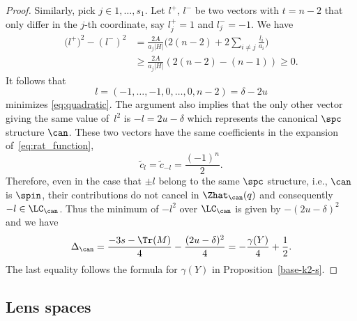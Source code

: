 \documentclass[10pt,a4paper]{amsart}
\begin{document}
\begin{proof}
Similarly, pick $j \in 1,\dots, s_1.$ Let $l^+$, $l^-$ be two vectors with $t = n-2$ that only differ in the $j$-th coordinate, say $l_j^+=1$ and $l^-_j=-1$. We have
\begin{align*}
 \bigl(l^+\bigr)^2 - (l^-)^2 & = \frac{2A}{a_j |H|} \biggl(2(n-2) + 2\sum_{i \neq j} \frac{l_i}{a_i}\biggr) \\
 & \geq \frac{2A}{a_j |H|} (2(n-2) - (n-1)) \geq 0.
\end{align*}
It follows that
\[
 l = (-1,\dots, -1, 0, \dots, 0, n-2) = \delta - 2u
\]
minimizes \eqref{eq:quadratic}. The argument also implies that the only other vector giving the same value of~$l^2$ is $-l=2u-\delta$ which represents the canonical $\spc$ structure $\can$. These two vectors have the same coefficients in the expansion of~\eqref{eq:rat_function},
\[
\tilde{c}_l = \tilde{c}_{-l} = \frac{(-1)^n}{2}.
\]
Therefore, even in the case that $\pm l$ belong to the same $\spc$ structure, i.e., $\can$ is $\spin$, their contributions do not cancel in $\Zhat_{\can}(q)$ and consequently $-l \in \LC_{\can}$.
Thus the minimum of $-l^2$ over $\LC_{\can}$ is given by $-(2u-\delta)^2$ and we have
 \begin{equation*}%
 \Delta_{\can} = \frac{-3s - \Tr(M)}{4} - \frac{(2u-\delta)^2}{4} = - \frac{\gamma(Y)}{4} + \frac{1}{2}.
 \end{equation*}
 The last equality follows the formula for $\gamma(Y)$ in Proposition~\ref{base-k2-s}.
\end{proof}

\subsection{Lens spaces}\label{ssec:lens}
\end{document}
